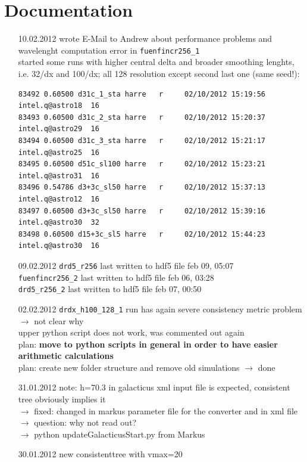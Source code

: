 \documentclass[a4paper,11pt,fleqn,oneside]{book}
\begin{document}
\tableofcontents


\chapter{Documentation}

\begin{itemize}

\item[10.02.2012]
wrote E-Mail to Andrew about performance problems and wavelenght computation error 
in \texttt{fuenfincr256\_1} \\
started some runs with higher central delta and broader smoothing lenghts, i.e. 
32/dx and 100/dx; all 128 resolution except second last one (same seed!): 
\begin{verbatim}
83492 0.60500 d31c_1_sta harre   r     02/10/2012 15:19:56 intel.q@astro18  16        
83493 0.60500 d31c_2_sta harre   r     02/10/2012 15:20:37 intel.q@astro29  16        
83494 0.60500 d31c_3_sta harre   r     02/10/2012 15:21:17 intel.q@astro25  16        
83495 0.60500 d51c_sl100 harre   r     02/10/2012 15:23:21 intel.q@astro31  16  
83496 0.54786 d3+3c_sl50 harre   r     02/10/2012 15:37:13 intel.q@astro12  16        
83497 0.60500 d3+3c_sl50 harre   r     02/10/2012 15:39:16 intel.q@astro30  32  
83498 0.60500 d15+3c_sl5 harre   r     02/10/2012 15:44:23 intel.q@astro30  16        
\end{verbatim}

\item[09.02.2012]
\texttt{drd5\_r256} last written to hdf5 file feb 09, 05:07 \\
\texttt{fuenfincr256\_2} last written to hdf5 file feb 06, 03:28 \\
\texttt{drd5\_r256\_2} last written to hdf5 file feb 07, 00:50 \\

\item[02.02.2012]
\texttt{drdx\_h100\_128\_1} run has again severe consistency 
metric problem \\ $\rightarrow$ not clear why \\
upper python script does not work, was commented out again \\
plan: \textbf{move to python scripts in general in order to have
 easier arithmetic calculations} \\   
plan: create new folder structure and remove old simulations $\rightarrow$ done \\

\item[31.01.2012]
note: h=70.3 in galacticus xml input file is expected, consistent tree obviously implies it \\
$\rightarrow$ fixed: changed in markus parameter file for the converter and in xml file \\
$\rightarrow$ question: why not read out? \\
$\rightarrow$ python updateGalacticusStart.py from Markus 

\item[30.01.2012]
new consistenttree with vmax=20



\end{itemize}
\end{document}
